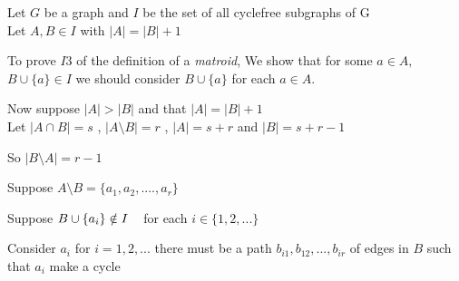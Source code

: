 \documentclass[../main.tex]{subfiles}
\begin{document}
 
 \noindent Let $G$ be a graph and $I$ be the set of all cyclefree subgraphs of G\\
 Let $ A ,B  \in  I $ with $ |A|  =  |B|  + 1 $
 
 \vspace{3mm}
 
 \noindent To prove $ I3 $ of the definition of a \textit{matroid}, We show that for some $ a \in A ,$\\$ B \cup \{a \} \in I $  we should consider $ B \cup \{a \} $ for each $ a \in A $. 
 
 \vspace{3mm}
 
 \noindent\Proof
 
 \noindent Now suppose $ |A|  >  |B| $ and that $|A|  =  |B| + 1$\\
 Let 
 $ |A \cap B| = s $ , $ |A \setminus B| = r$ ,
 $ |A| = s + r $ and $ |B| = s + r - 1$ 
 
\noindent So $ |B \setminus A| = r - 1$
 
 \vspace{3mm}
 
 \noindent Suppose $ A \setminus B = \{ a_1, a_2, .... , a_r \} $ 
 
 \noindent Suppose $ B \cup \{ a_i \} \notin I \hspace{3mm} $ for each $ i \in \{ 1,2,... \}$
 
 \vspace{2mm}
 
 \noindent Consider $ a_i $ for $ i = 1, 2,... $ there must be a path $ b_{i1}, b_{12}, ... , b_{ir} $ of edges in $B$ such that $ a_i $ make a cycle
  
 \vspace{2mm}
 
 \begin{minipage}{.2\textwidth}
 \end{minipage}
\hspace{4cm} \begin{minipage}{.2\textwidth}
 \end{minipage}
 
\end{document}
